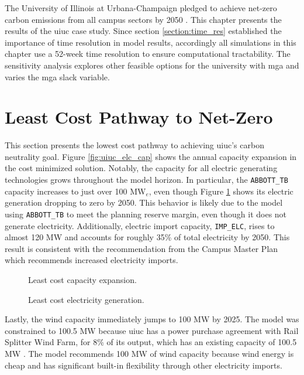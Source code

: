 The University of Illinois at Urbana-Champaign pledged to achieve net-zero carbon
emissions from all campus sectors by 2050
\cite{institute_for_sustainability_energy_and_environment_illinois_2015}. This
chapter presents the results of the \gls{uiuc} case study. Since section
\ref{section:time_res} established the importance of time resolution in model results,
accordingly all simulations in this chapter use a 52-week time resolution to ensure
computational tractability. The sensitivity analysis explores other feasible options
for the university with \gls{mga} and varies the \gls{mga} slack variable.

\section{Least Cost Pathway to Net-Zero}
This section presents the lowest cost pathway to achieving \gls{uiuc}'s carbon
neutrality goal.
Figure \ref{fig:uiuc_elc_cap} shows the annual capacity expansion in the cost
minimized solution. Notably, the capacity for all electric generating technologies
grows throughout the model horizon. In particular, the \texttt{ABBOTT\_TB} capacity
increases to just over 100 MW$_e$, even though Figure \ref{fig:uiuc_elc_gen}
shows its electric generation dropping to zero by 2050. This behavior is likely due to
the model using \texttt{ABBOTT\_TB} to meet the planning reserve margin, even
though it does not generate electricity. Additionally, electric import capacity,
\texttt{IMP\_ELC}, rises
to almost 120 MW and accounts for roughly 35\% of total electricity by 2050.
This result is consistent with the recommendation from the Campus Master Plan
\cite{affiliated_engineers_inc_utilities_2015} which recommends increased
electricity imports.

\begin{figure}[H]
  \begin{minipage}{0.48\textwidth}
    \captionsetup{type=figure}
    \centering
    \resizebox{\columnwidth}{!}{}
    \caption[]{Least cost capacity expansion.}
    \label{fig:uiuc_elc_cap}
  \end{minipage}
  \begin{minipage}{0.48\textwidth}
    \centering
    \resizebox{\columnwidth}{!}{}
    \caption[]{Least cost electricity generation.}
    \label{fig:uiuc_elc_gen}
  \end{minipage}
\end{figure}

Lastly, the wind capacity immediately jumps to 100 MW by 2025. The model was
constrained to 100.5 MW because \gls{uiuc} has a power purchase agreement with
Rail Splitter Wind Farm, for 8\% of its output, which has an existing capacity of
100.5 MW  \cite{breitweiser_wind_2016}. The model recommends 100 MW of wind
capacity because wind energy is cheap and has significant built-in flexibility
through other electricity imports.

